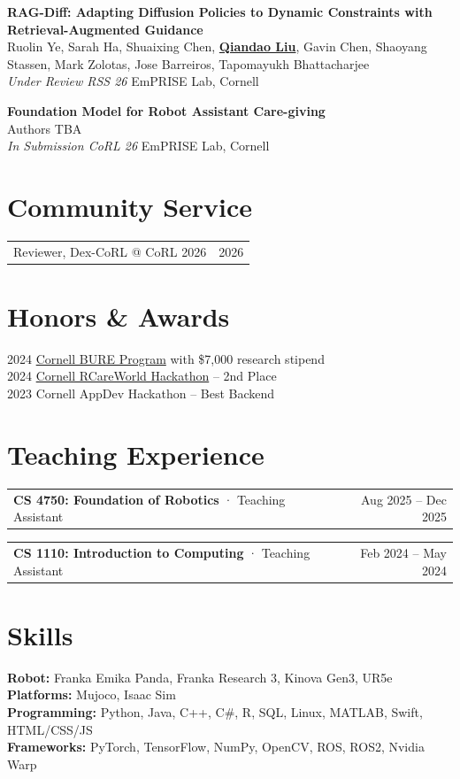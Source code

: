 \documentclass[10pt, a4paper]{article}
\makeatletter
\newcommand{\publication}[5]{%
\textbf{#1}\\[0.2em]
{\small\textcolor{secondary}{#2}}\\[0.1em]
{\small\textit{#3}}
\hfill\textcolor{secondary}{\small #4, #5}
\vspace{0.4em}}
\newcommand{\cvsingle}[3]{%
\begin{tabularx}{\textwidth}{@{}X r@{}}
\textbf{#1} \textcolor{secondary}{· #2} & \textcolor{secondary}{\small #3}
\end{tabularx}}
\newcommand{\serviceentry}[3]{%
\begin{tabularx}{\textwidth}{@{}X r@{}}
#1, #2 & \textcolor{secondary}{\small #3}
\end{tabularx}}
\newcommand{\award}[2]{\textcolor{secondary}{#1} \quad #2}
\newcommand{\skill}[2]{\textcolor{primary}{\textbf{#1:}} #2\\[0.15em]}
\makeatother
\begin{document}
\publication{RAG-Diff: Adapting Diffusion Policies to Dynamic Constraints with Retrieval-Augmented Guidance}
{Ruolin Ye, Sarah Ha, Shuaixing Chen, \textbf{\underline{Qiandao Liu}}, Gavin Chen, Shaoyang Stassen, Mark Zolotas, Jose Barreiros, Tapomayukh Bhattacharjee}
{Under Review RSS 26}
{EmPRISE Lab}{Cornell}

\publication{Foundation Model for Robot Assistant Care-giving}
{Authors TBA}
{In Submission CoRL 26}
{EmPRISE Lab}{Cornell}

\section{Community Service}
\serviceentry{Reviewer}{Dex-CoRL @ CoRL 2026}{2026}

\section{Honors \& Awards}
\award{2024}{\href{https://experience.cornell.edu/opportunities/bowers-undergraduate-research-experience-bure}{Cornell BURE Program} with \$7,000 research stipend}\\[0.15em]
\award{2024}{\href{https://emprise.cs.cornell.edu/hackathon/}{Cornell RCareWorld Hackathon} -- 2nd Place}\\[0.15em]
\award{2023}{Cornell AppDev Hackathon -- Best Backend}

\section{Teaching Experience}
\cvsingle{CS 4750: Foundation of Robotics}{Teaching Assistant}{Aug 2025 -- Dec 2025}

\vspace{0.1em}
\cvsingle{CS 1110: Introduction to Computing}{Teaching Assistant}{Feb 2024 -- May 2024}

\section{Skills}
\skill{Robot}{Franka Emika Panda, Franka Research 3, Kinova Gen3, UR5e}
\skill{Platforms}{Mujoco, Isaac Sim}
\skill{Programming}{Python, Java, C++, C\#, R, SQL, Linux, MATLAB, Swift, HTML/CSS/JS}
\skill{Frameworks}{PyTorch, TensorFlow, NumPy, OpenCV, ROS, ROS2, Nvidia Warp}
\end{document}
